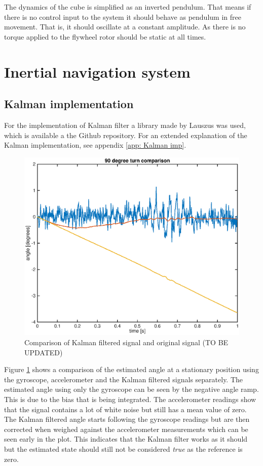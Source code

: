 \documentclass[a4paper,11pt]{kth-mag}
\begin{document}
The dynamics of the cube is simplified as an inverted pendulum. That means if there is no control input to the system it should behave as pendulum in free movement. That is, it should oscillate at a constant amplitude. As there is no torque applied to the flywheel rotor should be static at all times.

\section{Inertial navigation system}

\subsection{Kalman implementation}
For the implementation of Kalman filter a library made by Lauszus was used, which is available a the Github repository\cite{TKJkalman}. For an extended explanation of the Kalman implementation, see appendix \ref{app: Kalman imp}.

\begin{figure}[!htb]
\centering
\includegraphics[width = \textwidth]{Kalmancomparisonstat.eps}
\caption{Comparison of Kalman filtered signal and original signal (TO BE UPDATED)}
\label{Fig: Kalman comparison}
\end{figure}

Figure \ref{Fig: Kalman comparison} shows a comparison of the estimated angle at a stationary position using the gyroscope, accelerometer and the Kalman filtered signals separately. The estimated angle using only the gyroscope can be seen by the negative angle ramp. This is due to the bias that is being integrated. The accelerometer readings show that the signal contains a lot of white noise but still has a mean value of zero. 
The Kalman filtered angle starts following the gyroscope readings but are then corrected when weighed against the accelerometer measurements which can be seen early in the plot. 
This indicates that the Kalman filter works as it should but the estimated state should still not be considered \textit{true} as the reference is zero. 
\end{document}
